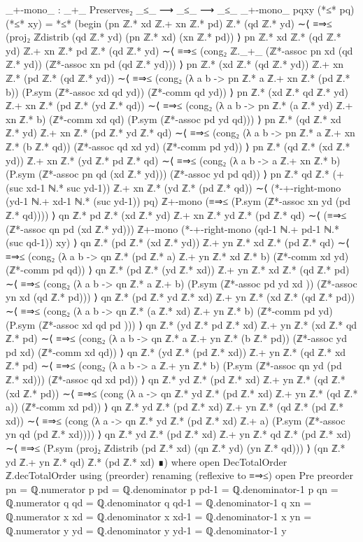 \documentclass[11pt,a4paper]{article}
\begin{document}
\begin{code}
_+-mono_ :  _+_ Preserves₂ _≤_ ⟶ _≤_ ⟶ _≤_
_+-mono_ {p}{q}{x}{y} (*≤* pq) (*≤* xy) = *≤* (begin
  (pn ℤ.* xd ℤ.+ xn ℤ.* pd) ℤ.* (qd ℤ.* yd)
  ∼⟨ ≡⇒≤ (proj₂ ℤdistrib (qd ℤ.* yd) (pn ℤ.* xd) (xn ℤ.* pd))   ⟩
  pn ℤ.* xd ℤ.* (qd ℤ.* yd) ℤ.+ xn ℤ.* pd ℤ.* (qd ℤ.* yd) 
  ∼⟨ ≡⇒≤ (cong₂ ℤ._+_ (ℤ*-assoc pn xd (qd ℤ.* yd))
    (ℤ*-assoc xn pd (qd ℤ.* yd))) ⟩
  pn ℤ.* (xd ℤ.* (qd ℤ.* yd)) ℤ.+ xn ℤ.* (pd ℤ.* (qd ℤ.* yd)) 
  ∼⟨ ≡⇒≤ (cong₂ (λ a b -> pn ℤ.* a ℤ.+ xn ℤ.* (pd ℤ.* b)) 
    (P.sym (ℤ*-assoc xd qd yd)) (ℤ*-comm qd yd)) ⟩
  pn ℤ.* (xd ℤ.* qd ℤ.* yd) ℤ.+ xn ℤ.* (pd ℤ.* (yd ℤ.* qd)) 
  ∼⟨ ≡⇒≤ (cong₂ (λ a b -> pn ℤ.* (a ℤ.* yd) ℤ.+ xn ℤ.* b) 
    (ℤ*-comm xd qd) (P.sym (ℤ*-assoc pd yd qd))) ⟩
  pn ℤ.* (qd ℤ.* xd ℤ.* yd) ℤ.+ xn ℤ.* (pd ℤ.* yd ℤ.* qd) 
  ∼⟨ ≡⇒≤ (cong₂ (λ a b -> pn ℤ.* a ℤ.+ xn ℤ.* (b ℤ.* qd)) 
    (ℤ*-assoc qd xd yd) (ℤ*-comm pd yd)) ⟩
  pn ℤ.* (qd ℤ.* (xd ℤ.* yd)) ℤ.+ xn ℤ.* (yd ℤ.* pd ℤ.* qd) 
  ∼⟨ ≡⇒≤ (cong₂ (λ a b -> a ℤ.+ xn ℤ.* b) 
    (P.sym (ℤ*-assoc pn qd (xd ℤ.* yd))) (ℤ*-assoc yd pd qd)) ⟩
  pn ℤ.* qd ℤ.* (+ (suc xd-1 ℕ.* suc yd-1)) ℤ.+ xn ℤ.*
    (yd ℤ.* (pd ℤ.* qd))
  ∼⟨ (*-+-right-mono (yd-1 ℕ.+ xd-1 ℕ.* (suc yd-1)) pq)
    ℤ+-mono
    (≡⇒≤ (P.sym (ℤ*-assoc xn yd (pd ℤ.* qd)))) ⟩
  qn ℤ.* pd ℤ.* (xd ℤ.* yd) ℤ.+ xn ℤ.* yd ℤ.* (pd ℤ.* qd) 
  ∼⟨ (≡⇒≤ (ℤ*-assoc qn pd (xd ℤ.* yd))) ℤ+-mono
    (*-+-right-mono (qd-1 ℕ.+ pd-1 ℕ.* (suc qd-1)) xy)  ⟩
  qn ℤ.* (pd ℤ.* (xd ℤ.* yd)) ℤ.+ yn ℤ.* xd ℤ.* (pd ℤ.* qd) 
  ∼⟨ ≡⇒≤ (cong₂ (λ a b -> qn ℤ.* (pd ℤ.* a) ℤ.+ yn ℤ.* xd ℤ.* b) 
    (ℤ*-comm xd yd) (ℤ*-comm pd qd)) ⟩
  qn ℤ.* (pd ℤ.* (yd ℤ.* xd)) ℤ.+ yn ℤ.* xd ℤ.* (qd ℤ.* pd) 
  ∼⟨ ≡⇒≤ (cong₂ (λ a b -> qn ℤ.* a ℤ.+ b) 
    (P.sym (ℤ*-assoc pd yd xd )) (ℤ*-assoc yn xd (qd ℤ.* pd))) ⟩
  qn ℤ.* (pd ℤ.* yd ℤ.* xd) ℤ.+ yn ℤ.* (xd ℤ.* (qd ℤ.* pd)) 
  ∼⟨ ≡⇒≤ (cong₂ (λ a b -> qn ℤ.* (a ℤ.* xd) ℤ.+ yn ℤ.* b) 
    (ℤ*-comm pd yd) (P.sym (ℤ*-assoc xd qd pd ))) ⟩
  qn ℤ.* (yd ℤ.* pd ℤ.* xd) ℤ.+ yn ℤ.* (xd ℤ.* qd ℤ.* pd) 
  ∼⟨ ≡⇒≤ (cong₂ (λ a b -> qn ℤ.* a ℤ.+ yn ℤ.* (b ℤ.* pd)) 
    (ℤ*-assoc yd pd xd) (ℤ*-comm xd qd)) ⟩
  qn ℤ.* (yd ℤ.* (pd ℤ.* xd)) ℤ.+ yn ℤ.* (qd ℤ.* xd ℤ.* pd) 
  ∼⟨ ≡⇒≤ (cong₂ (λ a b -> a ℤ.+ yn ℤ.* b) 
    (P.sym (ℤ*-assoc qn yd (pd ℤ.* xd))) (ℤ*-assoc qd xd pd)) ⟩
  qn ℤ.* yd ℤ.* (pd ℤ.* xd) ℤ.+ yn ℤ.* (qd ℤ.* (xd ℤ.* pd)) 
  ∼⟨ ≡⇒≤ (cong (λ a -> qn ℤ.* yd ℤ.* (pd ℤ.* xd) ℤ.+ yn ℤ.* (qd ℤ.* a)) 
    (ℤ*-comm xd pd)) ⟩
  qn ℤ.* yd ℤ.* (pd ℤ.* xd) ℤ.+ yn ℤ.* (qd ℤ.* (pd ℤ.* xd)) 
  ∼⟨ ≡⇒≤ (cong (λ a -> qn ℤ.* yd ℤ.* (pd ℤ.* xd) ℤ.+ a) 
    (P.sym (ℤ*-assoc yn qd (pd ℤ.* xd)))) ⟩
  qn ℤ.* yd ℤ.* (pd ℤ.* xd) ℤ.+ yn ℤ.* qd ℤ.* (pd ℤ.* xd) 
  ∼⟨ ≡⇒≤ (P.sym (proj₂ ℤdistrib (pd ℤ.* xd) (qn ℤ.* yd) (yn ℤ.* qd))) ⟩
  (qn ℤ.* yd ℤ.+ yn ℤ.* qd) ℤ.* (pd ℤ.* xd)
        ∎)
  where
     open DecTotalOrder ℤ.decTotalOrder using (preorder)
       renaming (reflexive to ≡⇒≤)
     open Pre preorder
     pn = ℚ.numerator p
     pd = ℚ.denominator p
     pd-1 = ℚ.denominator-1 p
     qn = ℚ.numerator q
     qd = ℚ.denominator q
     qd-1 = ℚ.denominator-1 q
     xn = ℚ.numerator x
     xd = ℚ.denominator x
     xd-1 = ℚ.denominator-1 x
     yn = ℚ.numerator y
     yd = ℚ.denominator y
     yd-1 = ℚ.denominator-1 y
\end{code}
\end{document}
